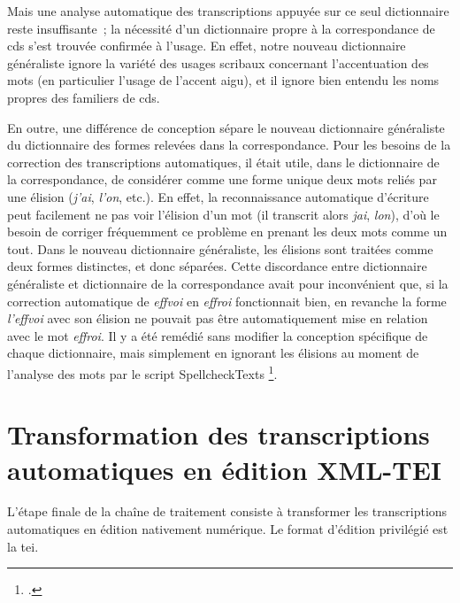 \documentclass[a4paper,12pt,twoside]{book}
\begin{document}
				Mais une analyse automatique des transcriptions appuyée sur ce seul dictionnaire reste insuffisante~; la nécessité d'un dictionnaire propre à la correspondance de \gls{cds} s'est trouvée confirmée à l'usage. En effet, notre nouveau dictionnaire généraliste ignore la variété des usages scribaux concernant l'accentuation des mots (en particulier l'usage de l'accent aigu), et il ignore bien entendu les noms propres des familiers de \gls{cds}. 
				
				En outre, une différence de conception sépare le nouveau dictionnaire généraliste du dictionnaire des formes relevées dans la correspondance. Pour les besoins de la correction des transcriptions automatiques, il était utile, dans le dictionnaire de la correspondance, de considérer comme une forme unique deux mots reliés par une élision (\textit{j'ai}, \textit{l'on}, etc.). En effet, la reconnaissance automatique d'écriture peut facilement ne pas voir l'élision d'un mot (il transcrit alors \textit{jai}, \textit{lon}), d'où le besoin de corriger fréquemment ce problème en prenant les deux mots comme un tout. Dans le nouveau dictionnaire généraliste, les élisions sont traitées comme deux formes distinctes, et donc séparées. Cette discordance entre dictionnaire généraliste et dictionnaire de la correspondance avait pour inconvénient que, si la correction automatique de \textit{effvoi} en \textit{effroi} fonctionnait bien, en revanche la forme \textit{l'effvoi} avec son élision ne pouvait pas être automatiquement mise en relation avec le mot \textit{effroi}. Il y a été remédié sans modifier la conception spécifique de chaque dictionnaire, mais simplement en ignorant les élisions au moment de l'analyse des mots par le script SpellcheckTexts
				\footcite{biaySpellcheckTextsPy2022}.
				
	
	\pagestyle{empty}
	\cleardoublepage
	\pagestyle{plain}			
		
	\chapter[Transformation TEI]{Transformation des transcriptions automatiques en édition XML-TEI}
		\label{chap3}
		
		L'étape finale de la chaîne de traitement consiste à transformer les transcriptions automatiques en édition nativement numérique. Le format d'édition privilégié est la \gls{tei}. 
		
\end{document}
